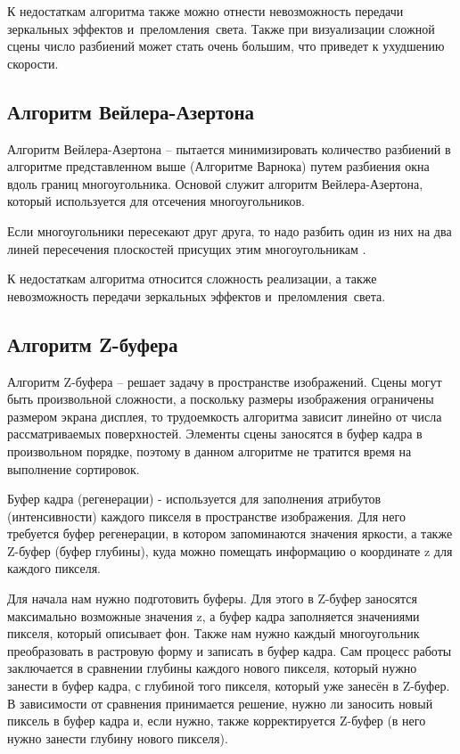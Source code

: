 К недостаткам алгоритма также можно отнести невозможность передачи зеркальных эффектов и преломления света. Также при визуализации сложной сцены число разбиений может стать очень большим, что приведет к ухудшению скорости.

\subsection{Алгоритм Вейлера-Азертона}

Алгоритм Вейлера-Азертона -- пытается минимизировать количество разбиений в алгоритме представленном выше (Алгоритме Варнока) путем разбиения окна вдоль границ многоугольника. Основой служит алгоритм Вейлера-Азертона, который используется для отсечения многоугольников.

Если многоугольники пересекают друг друга, то надо разбить один из них на два линей пересечения плоскостей присущих этим многоугольникам \cite{bib3}.

К недостаткам алгоритма относится сложность реализации, а также невозможность передачи зеркальных эффектов и преломления света.

\subsection{Алгоритм Z-буфера}

Алгоритм Z-буфера -- решает задачу в пространстве изображений. Сцены могут быть произвольной сложности, а поскольку размеры изображения ограничены размером экрана дисплея, то трудоемкость алгоритма зависит линейно от числа рассматриваемых поверхностей. Элементы сцены заносятся в буфер кадра в произвольном порядке, поэтому в данном алгоритме не тратится время на выполнение сортировок.

Буфер кадра (регенерации) - используется для заполнения атрибутов (интенсивности) каждого пикселя в пространстве изображения. Для него требуется буфер регенерации, в котором запоминаются значения яркости, а также Z-буфер (буфер глубины), куда можно помещать информацию о координате z для каждого пикселя.

Для начала нам нужно подготовить буферы. Для этого в Z-буфер заносятся максимально возможные значения z, а буфер кадра заполняется значениями пикселя, который описывает фон. Также нам нужно каждый многоугольник преобразовать в растровую форму и записать в буфер кадра. Сам процесс работы заключается в сравнении глубины каждого нового пикселя, который нужно занести в буфер кадра, с глубиной того пикселя, который уже занесён в Z-буфер. В зависимости от сравнения принимается решение, нужно ли заносить новый пиксель в буфер кадра и, если нужно, также корректируется Z-буфер (в него нужно занести глубину нового пикселя).


